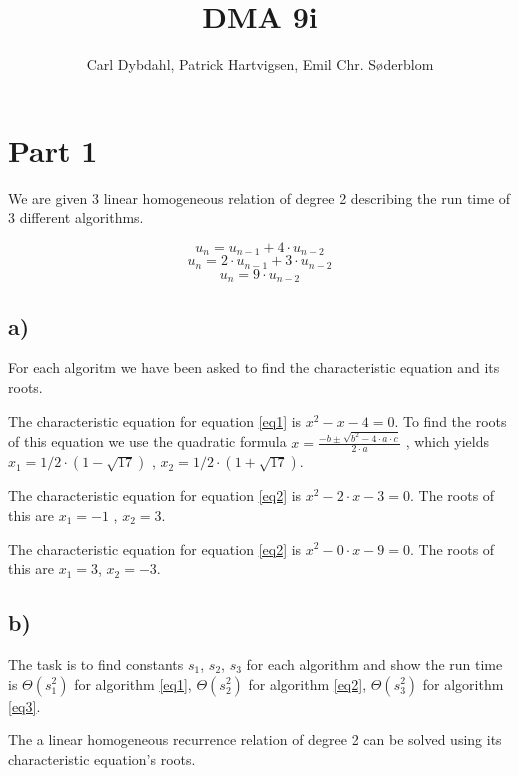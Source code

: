 \documentclass[a4paper]{article}
\title{DMA 9i}
\author{Carl Dybdahl, Patrick Hartvigsen, Emil Chr. Søderblom}
\begin{document}
\maketitle

\section*{Part 1}

We are given 3 linear homogeneous relation of degree 2 describing the run time of 3 different algorithms.

\begin{equation} \label{eq1} u_{n} = u_{n-1} + 4 \cdot u_{n-2} \end{equation}
\begin{equation} \label{eq2} u_{n} = 2 \cdot u_{n-1} + 3 \cdot u_{n-2} \end{equation}
\begin{equation} \label{eq3} u_{n} = 9 \cdot u_{n-2} \end{equation}

\subsection*{a)}
For each algoritm we have been asked to find the characteristic equation and its roots.

The characteristic equation for equation \ref{eq1} is
\(x^{2} - x - 4 = 0\).
To find the roots of this equation we use the quadratic formula
\(x=\frac{-b \pm \sqrt{b^2-4 \cdot a \cdot c}}{2 \cdot a} \)
, which yields
\(x_1 = 1/2 \cdot (1 - \sqrt{17})\) , \(x_2 = 1/2 \cdot (1 + \sqrt{17}) \).

The characteristic equation for equation \ref{eq2} is
\(x^{2} - 2 \cdot x - 3 = 0\).
The roots of this are
\(x_1 = -1\) , \(x_2 = 3\).

The characteristic equation for equation \ref{eq2} is
\(x^{2} - 0 \cdot x - 9 = 0\).
The roots of this are
\(x_1 = 3\), \(x_2 = -3\).

\subsection*{b)}
The task is to find constants \(s_1\), \(s_2\), \(s_3\) for each algorithm and show the run time is \(\Theta (s_1^2)\) for algorithm \ref{eq1}, \(\Theta (s_2^2)\) for algorithm \ref{eq2}, \(\Theta (s_3^2)\)  for algorithm \ref{eq3}.

The a linear homogeneous recurrence relation of degree 2 can be solved using its characteristic equation's roots.
\end{document}
